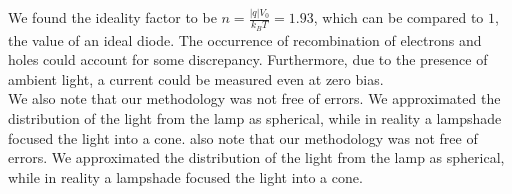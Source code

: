 \documentclass[a4paper]{article}
\begin{document}
We found the ideality factor to be $n = \frac{|q|V_0}{k_BT} = 1.93$, which can be compared to $1$, the value of an ideal diode. The occurrence of recombination of electrons and holes could account for some discrepancy. Furthermore, due to the presence of ambient light, a current could be measured even at zero bias. \\

We also note that our methodology was not free of errors. We approximated the distribution of the light from the lamp as spherical, while in reality a lampshade focused the light into a cone. also note that our methodology was not free of errors. We approximated the distribution of the light from the lamp as spherical, while in reality a lampshade focused the light into a cone.
\end{document}

